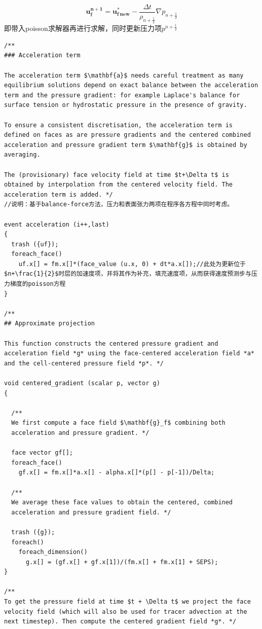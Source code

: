 \documentclass[lang=cn,11pt,a4paper]{elegantpaper}
\begin{document}
\begin{equation}
    \mathbf{u_f^{n+1}} = \mathbf{u^*_{f\ new}}-\frac{\Delta t}{\rho_{n+\frac{1}{2}}}\nabla p_{n+\frac{1}{2}}
\end{equation}
即带入poisson求解器再进行求解，同时更新压力项$p^{n+\frac{1}{2}}$
\begin{verbatim}
/**
### Acceleration term

The acceleration term $\mathbf{a}$ needs careful treatment as many
equilibrium solutions depend on exact balance between the acceleration
term and the pressure gradient: for example Laplace's balance for
surface tension or hydrostatic pressure in the presence of gravity.

To ensure a consistent discretisation, the acceleration term is
defined on faces as are pressure gradients and the centered combined
acceleration and pressure gradient term $\mathbf{g}$ is obtained by
averaging. 

The (provisionary) face velocity field at time $t+\Delta t$ is
obtained by interpolation from the centered velocity field. The
acceleration term is added. */
//说明：基于balance-force方法，压力和表面张力两项在程序各方程中同时考虑。

event acceleration (i++,last)
{
  trash ({uf});
  foreach_face()
    uf.x[] = fm.x[]*(face_value (u.x, 0) + dt*a.x[]);//此处为更新位于$n+\frac{1}{2}$时层的加速度项，并将其作为补充，填充速度项，从而获得速度预测步与压力梯度的poisson方程
}

/**
## Approximate projection

This function constructs the centered pressure gradient and
acceleration field *g* using the face-centered acceleration field *a*
and the cell-centered pressure field *p*. */

void centered_gradient (scalar p, vector g)
{

  /**
  We first compute a face field $\mathbf{g}_f$ combining both
  acceleration and pressure gradient. */

  face vector gf[];
  foreach_face()
    gf.x[] = fm.x[]*a.x[] - alpha.x[]*(p[] - p[-1])/Delta;

  /**
  We average these face values to obtain the centered, combined
  acceleration and pressure gradient field. */

  trash ({g});
  foreach()
    foreach_dimension()
      g.x[] = (gf.x[] + gf.x[1])/(fm.x[] + fm.x[1] + SEPS);
}

/**
To get the pressure field at time $t + \Delta t$ we project the face
velocity field (which will also be used for tracer advection at the
next timestep). Then compute the centered gradient field *g*. */


\end{verbatim}
\end{document}
